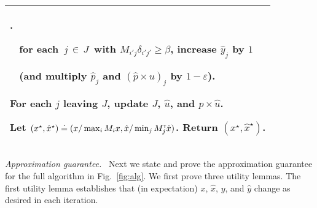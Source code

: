 \documentclass[11pt]{svjour3} \usepackage{fullpage}
\makeatletter
\renewcommand{\paragraph}[1]{\smallskip\vspace{2pt}\par{\em #1}~}
\newcommand{\primalOf}[1]{{{#1}}}
\newcommand{\dualOf}[1]{{\hat{#1}}}
\newcommand{\MM}{M}
\newcommand{\JJ}{J}
\newcommand{\xp}{\primalOf x}
\newcommand{\yp}{\primalOf y}
\newcommand{\pp}{\primalOf p}
\newcommand{\wwp}{\primalOf u}
\newcommand{\xd}{\dualOf x}
\newcommand{\yd}{\dualOf y}
\newcommand{\pd}{\dualOf p}
\newcommand{\wwd}{\dualOf u}
\newcommand{\dd}{\delta}
\newcommand{\algfont}{}
\newcommand{\tab}{\hspace*{0.13in}}
\newcounter{myline}
\newenvironment{alg}{
  \medskip
  \par
  \algfont
  \centering
    \begin{tabular}{|@{$\!$}|l|}\hline
      \begin{minipage}{0.96\linewidth}\raggedright
          \smallskip
          \begin{list}{\arabic{myline}.}{
            \usecounter{myline}
            \setlength{\listparindent}{0in}
            \setlength{\topsep}{0in}
            \setlength{\itemsep}{.013in}
            \setlength{\parsep}{.013in}
            \setlength{\rightmargin}{0in}
            \setlength{\itemindent}{0in}
\setlength{\labelsep}{0.065in}
            \setlength{\leftmargin}{0.2in}
}
          }{
        \end{list}
        \smallskip
      \end{minipage}\\\hline
    \end{tabular}
    \par
    \noindent
}
\newcommand{\A}{\item}
\newcommand{\algend}{\addtolength{\labelsep}{-0.13in}
  \addtolength{\itemindent}{-0.13in}
  \addtolength{\listparindent}{-0.13in}
}
\newcommand{\eps}{\varepsilon}
\newcommand{\tran}{^{\scriptscriptstyle \sf T\hspace*{-0.05em}}}
\makeatother
\begin{document}
\begin{figure*}[t]
\begin{alg}
\A \tab~ for each\, $j\,\in\, \JJ$\, with $\MM_{i'j}\dd_{i'j'}\ge \beta$,
{increase} $\yd_{j}$ by $1$
\label{line:incyd}
\A \tab~ \hfill (and multiply $\pd_{j}$ and $(\pd\times\wwp)_{j}$ by $1-\eps$).

\A For each $j$ leaving $\JJ$, update $\JJ$, $\wwd$, and $\pp\times\wwd$.

\algend

\A Let $(\xp^\star,\xd^\star) \doteq (\xp/\max_i \MM_i\xp, \xd/\min_j \MM_j\tran\xd)$.
{Return} $(\xp^\star,\xd^\star)$.
\end{alg}

\caption{The full algorithm.
$[i]$ denotes $\{1,2,\ldots,i\}$.
Implementation details are in Section~\ref{sec:implementation}.
}
\label{fig:alg}
\end{figure*}


\paragraph{Approximation guarantee.} \label{sec:correctness}
Next we state and prove the approximation guarantee for the full algorithm
in Fig.~\ref{fig:alg}.   We first prove three utility lemmas.
The first utility lemma establishes that (in expectation)
$\xp$, $\xd$, $\yp$, and $\yd$ change 
as desired in each iteration.
\newpage
\end{document}
